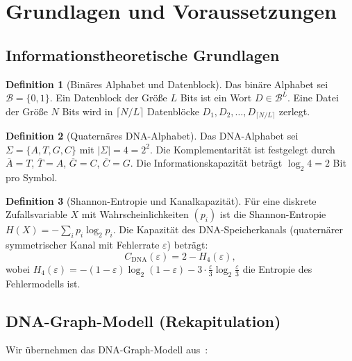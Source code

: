﻿\documentclass[a4paper,12pt]{article}
\theoremstyle{definition}
\newtheorem{definition}{Definition}
\begin{document}
\section{Grundlagen und Voraussetzungen}
\label{sec:grundlagen}

\subsection{Informationstheoretische Grundlagen}

\begin{definition}[Bin\"{a}res Alphabet und Datenblock]
    Das bin\"{a}re Alphabet sei $\mathcal{B} = \{0, 1\}$.
    Ein Datenblock der Gr\"{o}\ss{}e $L$ Bits ist ein Wort
    $D \in \mathcal{B}^L$.
    Eine Datei der Gr\"{o}\ss{}e $N$ Bits wird in $\lceil N/L \rceil$
    Datenbl\"{o}cke $D_1, D_2, \ldots, D_{\lceil N/L \rceil}$ zerlegt.
\end{definition}

\begin{definition}[Quaternäres DNA-Alphabet]
    Das DNA-Alphabet sei $\Sigma = \{A, T, G, C\}$ mit
    $|\Sigma| = 4 = 2^2$. Die Komplementarit\"{a}t ist festgelegt durch
    $\overline{A}=T$, $\overline{T}=A$, $\overline{G}=C$, $\overline{C}=G$.
    Die Informationskapazit\"{a}t betr\"{a}gt $\log_2 4 = 2$ Bit pro Symbol.
\end{definition}

\begin{definition}[Shannon-Entropie und Kanalkapazit\"{a}t]
    F\"{u}r eine diskrete Zufallsvariable $X$ mit Wahrscheinlichkeiten
    $(p_i)$ ist die Shannon-Entropie
    $H(X) = -\sum_i p_i \log_2 p_i$.
    Die Kapazit\"{a}t des DNA-Speicherkanals (quaternärer symmetrischer
    Kanal mit Fehlerrate $\varepsilon$) betr\"{a}gt:
    \[
        C_{\text{DNA}}(\varepsilon) = 2 - H_4(\varepsilon),
    \]
    wobei $H_4(\varepsilon) = -(1-\varepsilon)\log_2(1-\varepsilon)
    - 3 \cdot \frac{\varepsilon}{3}\log_2\frac{\varepsilon}{3}$
    die Entropie des Fehlermodells ist.
\end{definition}

\subsection{DNA-Graph-Modell (Rekapitulation)}

Wir \"{u}bernehmen das DNA-Graph-Modell aus~\cite{epp_dna2026}:
\end{document}
